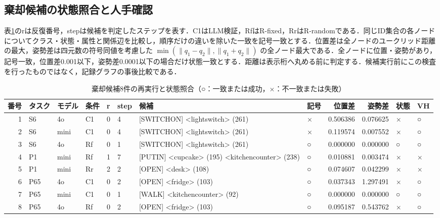 \subsection{棄却候補の状態照合と人手確認}\label{app:review_conditions}
表\ref{tab:replay_internal}のrは反復番号，stepは候補を判定したステップを表す．C1はLLM検証，RfはR-fixed，RrはR-randomである．同じID集合の各ノードについてクラス・状態・属性と関係辺を比較し，順序だけの違いを除いた一致を記号一致とする．位置差は全ノードのユークリッド距離の最大，姿勢差は四元数の符号同値を考慮した $\min(\|q_1-q_2\|,\|q_1+q_2\|)$ の全ノード最大である．全ノードに位置・姿勢があり，記号一致，位置差0.001以下，姿勢差0.0001以下の場合だけ状態一致とする．距離は表示桁へ丸める前に判定する．候補実行前にこの検査を行ったものではなく，記録グラフの事後比較である．
\begin{table}[tb]
\caption{棄却候補8件の再実行と状態照合（○：一致または成功，×：不一致または失敗）}\label{tab:replay_internal}
\centering\small
\setlength{\tabcolsep}{3pt}
\begin{tabular}{rlllllp{}lrrll}
\hline
番号 & タスク & モデル & 条件 & r & step & 候補 & 記号 & 位置差 & 姿勢差 & 状態 & VH \\
\hline
1 & S6 & 4o & C1 & 0 & 4 & [SWITCHON] \textless{}lightswitch\textgreater{} (261) & × & 0.506386 & 0.076625 & × & ○ \\
2 & S6 & mini & C1 & 0 & 4 & [SWITCHON] \textless{}lightswitch\textgreater{} (261) & × & 0.119574 & 0.007552 & × & ○ \\
3 & S6 & 4o & Rf & 0 & 1 & [SWITCHON] \textless{}lightswitch\textgreater{} (261) & ○ & 0.000000 & 0.000000 & ○ & ○ \\
4 & P1 & mini & Rf & 1 & 7 & [PUTIN] \textless{}cupcake\textgreater{} (195) \textless{}kitchencounter\textgreater{} (238) & ○ & 0.010881 & 0.003474 & × & × \\
5 & P1 & mini & Rr & 2 & 2 & [OPEN] \textless{}desk\textgreater{} (108) & ○ & 0.074607 & 0.042299 & × & × \\
6 & P65 & 4o & C1 & 0 & 2 & [OPEN] \textless{}fridge\textgreater{} (103) & ○ & 0.037343 & 1.297491 & × & ○ \\
7 & P65 & mini & C1 & 0 & 1 & [WALK] \textless{}kitchencounter\textgreater{} (92) & ○ & 0.000000 & 0.000000 & ○ & ○ \\
8 & P65 & 4o & Rf & 0 & 2 & [OPEN] \textless{}fridge\textgreater{} (103) & ○ & 0.095187 & 0.543762 & × & ○ \\
\hline
\end{tabular}
\end{table}

